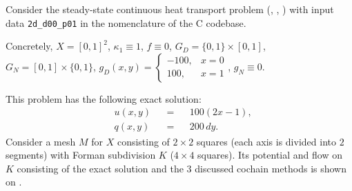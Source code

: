 \begin{example}
  Consider the steady-state continuous heat transport problem
  (,
   ,
   )
  with input data \verb|2d_d00_p01| in the nomenclature of the C codebase.

  Concretely, $X = [0, 1]^2$, $\kappa_1 \equiv 1$, $f \equiv 0$,
  $G_D = \{0, 1\} \times [0, 1]$, $G_N = [0, 1] \times \{0, 1\}$,
  $g_D(x, y) = \begin{cases} -100, & x = 0 \\ 100, & x = 1 \end{cases}$,
  $g_N \equiv 0$.

  This problem has the following exact solution:
  \begin{subequations}
    \begin{alignat}{3}
      & u(x, y) && = && 100 (2 x - 1), \\
      & q(x, y) && = && 200\, d y.
    \end{alignat}
  \end{subequations}
  Consider a mesh $M$ for $X$ consisting of $2 \times 2$ squares (each axis is
  divided into $2$ segments) with Forman subdivision $K$ ($4 \times 4$ squares).
  Its potential and flow on $K$ consisting of the exact solution and the $3$
  discussed cochain methods is shown on
  .
\end{example}
